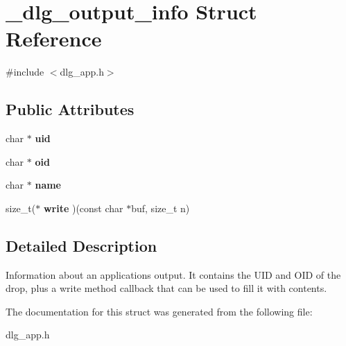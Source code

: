 \hypertarget{struct__dlg__output__info}{}\section{\+\_\+dlg\+\_\+output\+\_\+info Struct Reference}
\label{struct__dlg__output__info}


{\ttfamily \#include $<$dlg\+\_\+app.\+h$>$}

\subsection*{Public Attributes}
\begin{DoxyCompactItemize}
\item 
\mbox{\label{struct__dlg__output__info_a7ef5f8503de65e89b275a307ad7bc83b}} 
char $\ast$ {\bfseries uid}
\item 
\mbox{\label{struct__dlg__output__info_ac00d1ea609244eea05c393d155909ec1}} 
char $\ast$ {\bfseries oid}
\item 
\mbox{\label{struct__dlg__output__info_a544aa3ba2d2b55fb929c44719df7d66e}} 
char $\ast$ {\bfseries name}
\item 
\mbox{\label{struct__dlg__output__info_aa56aba2ddd30a20249529172cfcfc527}} 
size\+\_\+t($\ast$ {\bfseries write} )(const char $\ast$buf, size\+\_\+t n)
\end{DoxyCompactItemize}


\subsection{Detailed Description}
Information about an application\textquotesingle{}s output. It contains the U\+ID and O\+ID of the drop, plus a write method callback that can be used to fill it with contents. 

The documentation for this struct was generated from the following file\+:\begin{DoxyCompactItemize}
\item 
dlg\+\_\+app.\+h\end{DoxyCompactItemize}
